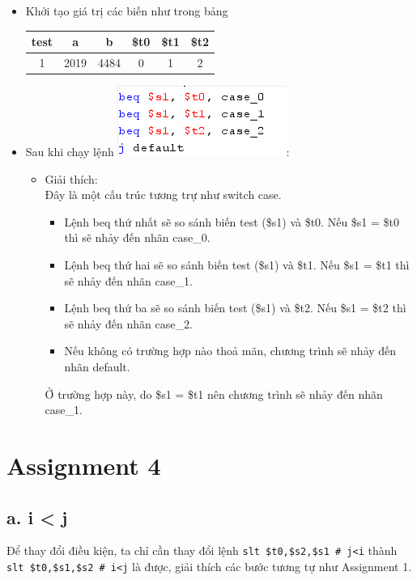 \documentclass[12pt,a4paper,oneside]{article}
\begin{document}
\begin{itemize}
\item Khởi tạo giá trị các biến như trong bảng
\begin{center}
\begin{tabular}{|c|c|c|c|c|c|}
\hline 
test & a & b & \$t0 & \$t1 & \$t2 \\ 
\hline 
1 & 2019 & 4484 & 0 & 1 & 2 \\ 
\hline 
\end{tabular} 
\end{center}

\item Sau khi chạy lệnh \qquad \includegraphics[scale=1]{image/3.2}:\\
\begin{itemize}

\item Giải thích:\\
Đây là một cấu trúc tương trự như switch case.
\begin{itemize}

\item Lệnh beq thứ nhất sẽ so sánh biến test (\$s1) và \$t0. Nếu \$s1 = \$t0 thì sẽ nhảy đến nhãn case\_0.
\item Lệnh beq thứ hai sẽ so sánh biến test (\$s1) và \$t1. Nếu \$s1 = \$t1 thì sẽ nhảy đến nhãn case\_1.
\item Lệnh beq thứ ba sẽ so sánh biến test (\$s1) và \$t2. Nếu \$s1 = \$t2 thì sẽ nhảy đến nhãn case\_2.
\item Nếu không có trường hợp nào thoả mãn, chương trình sẽ nhảy đến nhãn default.
\end{itemize}
Ở trường hợp này, do \$s1 = \$t1 nên chương trình sẽ nhảy đến nhãn case\_1.
\end{itemize}
\end{itemize}




\pagebreak
\section{Assignment 4}
\subsection*{a. i < j}
Để thay đổi điều kiện, ta chỉ cần thay đổi lệnh \lstinline{slt $t0,$s2,$s1 # j<i} thành \lstinline{slt $t0,$s1,$s2 # i<j} là được, giải thích các bước tương tự như Assignment 1.
\end{document}
